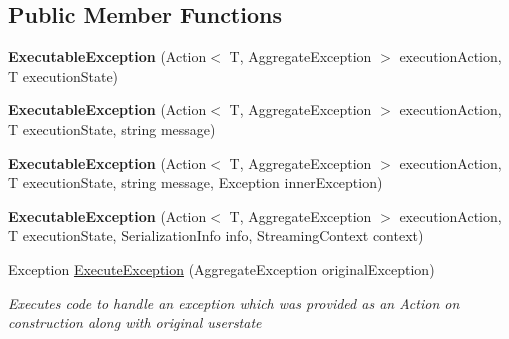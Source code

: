 \subsection*{Public Member Functions}
\begin{DoxyCompactItemize}
\item 
\hypertarget{class_cloud_api_public_1_1_sync_1_1_executable_exception_3_01_t_01_4_abb8a1abe6ed2cdd7fc9187a1d3e00f59}{{\bfseries Executable\-Exception} (Action$<$ T, Aggregate\-Exception $>$ execution\-Action, T execution\-State)}\label{class_cloud_api_public_1_1_sync_1_1_executable_exception_3_01_t_01_4_abb8a1abe6ed2cdd7fc9187a1d3e00f59}

\item 
\hypertarget{class_cloud_api_public_1_1_sync_1_1_executable_exception_3_01_t_01_4_a02ab6d3b53951f6fbd1131f61f01c9eb}{{\bfseries Executable\-Exception} (Action$<$ T, Aggregate\-Exception $>$ execution\-Action, T execution\-State, string message)}\label{class_cloud_api_public_1_1_sync_1_1_executable_exception_3_01_t_01_4_a02ab6d3b53951f6fbd1131f61f01c9eb}

\item 
\hypertarget{class_cloud_api_public_1_1_sync_1_1_executable_exception_3_01_t_01_4_ad4a4dbd6b8ba958edec467cf313c2e17}{{\bfseries Executable\-Exception} (Action$<$ T, Aggregate\-Exception $>$ execution\-Action, T execution\-State, string message, Exception inner\-Exception)}\label{class_cloud_api_public_1_1_sync_1_1_executable_exception_3_01_t_01_4_ad4a4dbd6b8ba958edec467cf313c2e17}

\item 
\hypertarget{class_cloud_api_public_1_1_sync_1_1_executable_exception_3_01_t_01_4_a433ee27281e9e4780fa1fb3618362586}{{\bfseries Executable\-Exception} (Action$<$ T, Aggregate\-Exception $>$ execution\-Action, T execution\-State, Serialization\-Info info, Streaming\-Context context)}\label{class_cloud_api_public_1_1_sync_1_1_executable_exception_3_01_t_01_4_a433ee27281e9e4780fa1fb3618362586}

\item 
Exception \hyperlink{class_cloud_api_public_1_1_sync_1_1_executable_exception_3_01_t_01_4_a8fbe98c76989f12ce54389fbebdd6023}{Execute\-Exception} (Aggregate\-Exception original\-Exception)
\begin{DoxyCompactList}\small\item\em Executes code to handle an exception which was provided as an Action on construction along with original userstate \end{DoxyCompactList}\end{DoxyCompactItemize}

